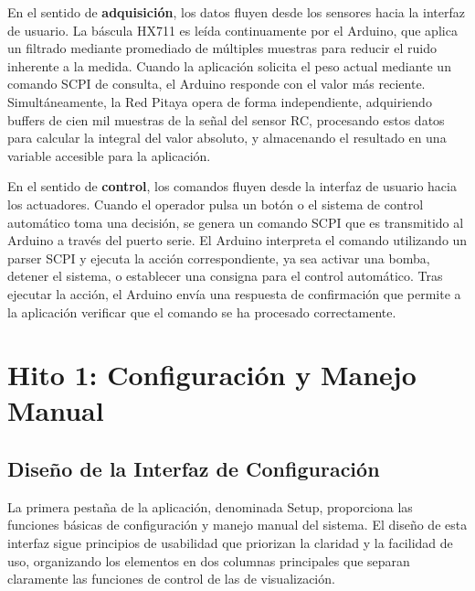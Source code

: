 \documentclass[12pt,a4paper]{article}
\begin{document}
En el sentido de \textbf{adquisición}, los datos fluyen desde los sensores hacia la interfaz de usuario. La báscula HX711 es leída continuamente por el Arduino, que aplica un filtrado mediante promediado de múltiples muestras para reducir el ruido inherente a la medida. Cuando la aplicación solicita el peso actual mediante un comando SCPI de consulta, el Arduino responde con el valor más reciente. Simultáneamente, la Red Pitaya opera de forma independiente, adquiriendo buffers de cien mil muestras de la señal del sensor RC, procesando estos datos para calcular la integral del valor absoluto, y almacenando el resultado en una variable accesible para la aplicación.

En el sentido de \textbf{control}, los comandos fluyen desde la interfaz de usuario hacia los actuadores. Cuando el operador pulsa un botón o el sistema de control automático toma una decisión, se genera un comando SCPI que es transmitido al Arduino a través del puerto serie. El Arduino interpreta el comando utilizando un parser SCPI y ejecuta la acción correspondiente, ya sea activar una bomba, detener el sistema, o establecer una consigna para el control automático. Tras ejecutar la acción, el Arduino envía una respuesta de confirmación que permite a la aplicación verificar que el comando se ha procesado correctamente.

\section{Hito 1: Configuración y Manejo Manual}

\subsection{Diseño de la Interfaz de Configuración}

La primera pestaña de la aplicación, denominada Setup, proporciona las funciones básicas de configuración y manejo manual del sistema. El diseño de esta interfaz sigue principios de usabilidad que priorizan la claridad y la facilidad de uso, organizando los elementos en dos columnas principales que separan claramente las funciones de control de las de visualización.
\end{document}
